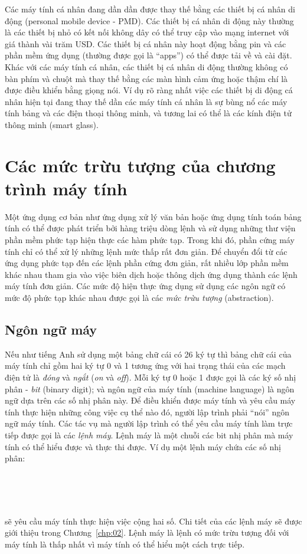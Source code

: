 Các máy tính cá nhân đang dần dần được thay thế bằng các thiết bị cá nhân di động (personal mobile device - PMD). Các thiết bị cá nhân di động này thường là các thiết bị nhỏ có kết nối không dây có thể truy cập vào mạng internet với giá thành vài trăm USD. Các thiết bị cá nhân này hoạt động bằng pin và các phần mềm ứng dụng (thường được gọi là ``apps'') có thể được tải về và cài đặt. Khác với các máy tính cá nhân, các thiết bị cá nhân di động thường không có bàn phím và chuột mà thay thế bằng các màn hình cảm ứng hoặc thậm chí là được điều khiển bằng giọng nói. Ví dụ rõ ràng nhất việc các thiết bị di động cá nhân hiện tại đang thay thế dần các máy tính cá nhân là sự bùng nổ các máy tính bảng và các điện thoại thông minh, và tương lai có thể là các kính điện tử thông minh (smart glass).

\section{Các mức trừu tượng của chương trình máy tính}
Một ứng dụng cơ bản như ứng dụng xử lý văn bản hoặc ứng dụng tính toán bảng tính có thể được phát triển bởi hàng triệu dòng lệnh và sử dụng những thư viện phần mềm phức tạp hiện thực các hàm phức tạp. Trong khi đó, phần cứng máy tính chỉ có thể xử lý những lệnh mức thấp rất đơn giản. Để chuyển đổi từ các ứng dụng phức tạp đến các lệnh phần cứng đơn giản, rất nhiều lớp phần mềm khác nhau tham gia vào việc biên dịch hoặc thông dịch ứng dụng thành các lệnh máy tính đơn giản. Các mức độ hiện thực ứng dụng sử dụng các ngôn ngữ có mức độ phức tạp khác nhau được gọi là các \emph{mức trừu tượng} (abstraction).

\subsection{Ngôn ngữ máy}
Nếu như tiếng Anh sử dụng một bảng chữ cái có 26 ký tự thì bảng chữ cái của máy tính chỉ gồm hai ký tự 0 và 1 tương ứng với hai trạng thái của các mạch điện tử là \emph{đóng} và \emph{ngắt} (\emph{on} và \emph{off}). Mỗi ký tự 0 hoặc 1 được gọi là các ký số nhị phân - \emph{bit} (binary digit); và ngôn ngữ của máy tính (machine language) là ngôn ngữ dựa trên các số nhị phân này. Để điều khiển được máy tính và yêu cầu máy tính thực hiện những công việc cụ thể nào đó, người lập trình phải ``nói'' ngôn ngữ máy tính. Các tác vụ mà người lập trình có thể yêu cầu máy tính làm trực tiếp được gọi là các \emph{lệnh máy}. Lệnh máy là một chuỗi các bit nhị phân mà máy tính có thể hiểu được và thực thi được. Ví dụ một lệnh máy chứa các số nhị phân:\\
\\
\begin{minipage}[l]{8cm}
\leftskip=0.5cm
{}\\
\end{minipage}
\\
sẽ yêu cầu máy tính thực hiện việc cộng hai số. Chi tiết của các lệnh máy sẽ được giới thiệu trong Chương~\ref{chp:02}. Lệnh máy là lệnh có mức trừu tượng đối với máy tính là thấp nhất vì máy tính có thể hiểu một cách trực tiếp.

